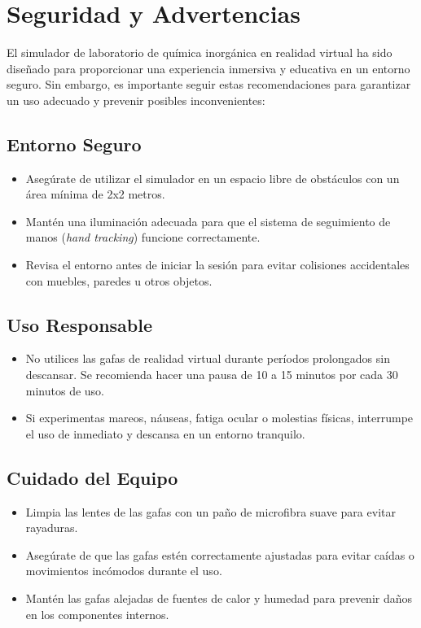 \section{Seguridad y Advertencias}

El simulador de laboratorio de química inorgánica en realidad virtual ha sido diseñado para proporcionar una experiencia inmersiva y educativa en un entorno seguro. Sin embargo, es importante seguir estas recomendaciones para garantizar un uso adecuado y prevenir posibles inconvenientes:

\subsection{Entorno Seguro}
\begin{itemize}
    \item Asegúrate de utilizar el simulador en un espacio libre de obstáculos con un área mínima de 2x2 metros.
    \item Mantén una iluminación adecuada para que el sistema de seguimiento de manos (\textit{hand tracking}) funcione correctamente.
    \item Revisa el entorno antes de iniciar la sesión para evitar colisiones accidentales con muebles, paredes u otros objetos.
\end{itemize}

\subsection{Uso Responsable}
\begin{itemize}
    \item No utilices las gafas de realidad virtual durante períodos prolongados sin descansar. Se recomienda hacer una pausa de 10 a 15 minutos por cada 30 minutos de uso.
    \item Si experimentas mareos, náuseas, fatiga ocular o molestias físicas, interrumpe el uso de inmediato y descansa en un entorno tranquilo.
\end{itemize}

\subsection{Cuidado del Equipo}
\begin{itemize}
    \item Limpia las lentes de las gafas con un paño de microfibra suave para evitar rayaduras.
    \item Asegúrate de que las gafas estén correctamente ajustadas para evitar caídas o movimientos incómodos durante el uso.
    \item Mantén las gafas alejadas de fuentes de calor y humedad para prevenir daños en los componentes internos.
\end{itemize}

